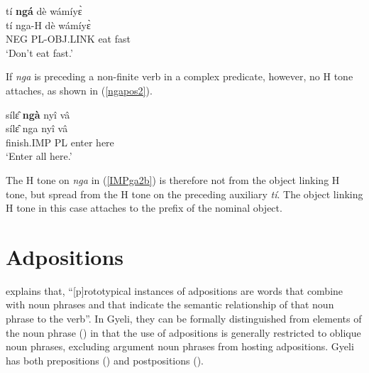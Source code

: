 \begin{exe} 
\ex\label{ngapos1}
  \glll tí {\bfseries ngá} dè wámíyɛ̀ \\
       tí nga-H dè wámíyɛ̀ \\
        NEG PL-OBJ.LINK eat fast \\
    \trans `Don't eat fast.'
\end{exe}

\noindent If {\itshape nga} is preceding a non-finite verb in a complex predicate, however, no H tone attaches, as shown in (\ref{ngapos2}).

\begin{exe} 
\ex\label{ngapos2}
  \glll sílɛ̂ {\bfseries ngà} nyî vâ \\
       sílɛ̂ nga nyî vâ \\
        finish.IMP PL enter here \\
    \trans `Enter all here.'
\end{exe}

\noindent The H tone on {\itshape nga} in (\ref{IMPga2b}) is therefore not from the object linking H tone, but spread from the H tone on the preceding auxiliary {\itshape tí}. The object linking H tone in this case attaches to the prefix of the nominal object.
















\section{Adpositions} 
\label{sec:Adpos}

\citet[81-82]{dryer2007b} explains that, ``[p]rototypical instances of adpositions are words that combine with noun phrases and that indicate the semantic relationship of that noun phrase to the verb''. In Gyeli, they can be formally distinguished from elements of the noun phrase () in that the use of adpositions is generally restricted to oblique noun phrases, excluding argument noun phrases from hosting adpositions.
Gyeli has both prepositions () and postpositions ().   






